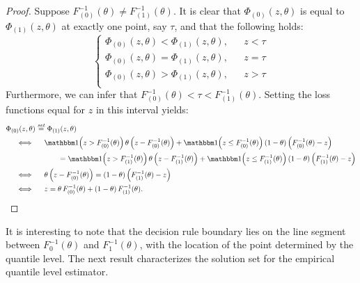 \begin{proof}
  Suppose $F_{(0)}^{-1}(\theta) \ne F_{(1)}^{-1}(\theta)$.  It is clear that
  $\Phi_{(0)}(z, \theta)$ is equal to $\Phi_{(1)}(z, \theta)$ at exactly one
  point, say $\tau$, and that the following holds:
  \begin{equation*}
    \left\{
      \begin{array}{lll}
        \Phi_{(0)}(z, \theta) < \Phi_{(1)}(z, \theta), & & z < \tau \\[1ex]
        \Phi_{(0)}(z, \theta) = \Phi_{(1)}(z, \theta), & & z = \tau \\[1ex]
        \Phi_{(0)}(z, \theta) > \Phi_{(1)}(z, \theta), & & z > \tau \\
      \end{array}
    \right.
  \end{equation*}
  Furthermore, we can infer that
  $F_{(0)}^{-1}(\theta) < \tau < F_{(1)}^{-1}(\theta)$.  Setting the loss
  functions equal for $z$ in this interval yields:
  \begin{align*}
    & \Phi_{(0)}(z, \theta) \stackrel{\mathit{set}}{=} \Phi_{(1)}(z, \theta) \\
    & \hspace{5mm} \Longleftrightarrow \hspace{5mm}
      \ind\!\! \left(z > F_{(0)}^{-1}(\theta)\right) \theta
      \left(z - F_{(0)}^{-1}(\theta)\right) +
      \ind\!\! \left(z \leq F_{(0)}^{-1}(\theta)\right) (1 - \theta)
      \left(F_{(0)}^{-1}(\theta) - z\right) \\
    & \hspace{25mm} =
      \ind\!\! \left(z > F_{(1)}^{-1}(\theta)\right) \theta
      \left(z - F_{(1)}^{-1}(\theta)\right) +
      \ind\!\! \left(z \leq F_{(1)}^{-1}(\theta)\right) (1 - \theta)
      \left(F_{(1)}^{-1}(\theta) - z\right) \\
    & \hspace{5mm} \Longleftrightarrow \hspace{5mm}
      \theta \left(z - F_{(0)}^{-1}(\theta)\right) =
      (1 - \theta) \left(F_{(1)}^{-1}(\theta) - z\right) \\
    & \hspace{5mm} \Longleftrightarrow \hspace{5mm}
      z = \theta\, F_{(0)}^{-1}(\theta) + (1 - \theta)\, F_{(1)}^{-1}(\theta).
  \end{align*}
\end{proof}
It is interesting to note that the decision rule boundary lies on the line
segment between $F_0^{-1}(\theta)$ and $F_1^{-1}(\theta)$, with the location of
the point determined by the quantile level.  The next result characterizes the
solution set for the empirical quantile level estimator.

